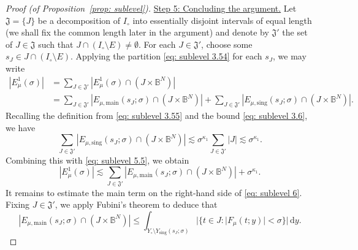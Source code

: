 \documentclass[reqno]{amsart}
\numberwithin{equation}{section}
\newcommand{\B}{\mathbb{B}}
\newcommand{\ud}{\mathrm{d}}
\newcommand{\fJ}{\mathfrak{J}}
\theoremstyle{plain}
\theoremstyle{definition}
\begin{document}
\begin{proof}[Proof (of Proposition~\ref{prop: sublevel})]



\noindent \underline{Step 5: Concluding the argument.} 
Let $\fJ = \{J\}$ be a decomposition of $I_{\circ}$ into essentially disjoint intervals of equal length (we shall fix the common length later in the argument) and denote by $\fJ'$
the set of $J\in \fJ$ such that $J \cap (I_{\circ}\setminus E) \neq \emptyset$. For each $J \in \fJ'$, choose some $s_J \in J \cap (I_{\circ} \setminus E)$. Applying the partition \eqref{eq: sublevel 3.54} for each $s_J$, we may write
\begin{align}
\nonumber
|E^1_{\mu}(\sigma)| &= \sum_{J \in \fJ'} |E^1_{\mu}(\sigma) \cap (J \times \B^N)| \\
\label{eq: sublevel 5.5}
&= \sum_{J \in \fJ'} |E_{\mu, \mathrm{main}}(s_J;\sigma) \cap (J \times \B^N)| +  \sum_{J \in \fJ'} |E_{\mu, \mathrm{sing}}(s_J;\sigma) \cap (J \times \B^N)|  .
\end{align}
Recalling the definition from \eqref{eq: sublevel 3.55} and the bound \eqref{eq: sublevel 3.6}, we have
\begin{equation*}
    \sum_{J \in \fJ'}|E_{\mu, \mathrm{sing}}(s_J; \sigma)\cap (J \times \B^N)| \lesssim \sigma^{\kappa_1} \sum_{J \in \fJ'} |J| \lesssim \sigma^{\kappa_1}.
\end{equation*}
Combining this with \eqref{eq: sublevel 5.5}, we obtain
\begin{equation}\label{eq: sublevel 6}
   |E^1_{\mu}(\sigma)| \lesssim \sum_{J \in \fJ'}|E_{\mu, \mathrm{main}}(s_J; \sigma)\cap (J \times \B^N)| + \sigma^{\kappa_1}.
\end{equation}
It remains to estimate the main term on the right-hand side of \eqref{eq: sublevel 6}. Fixing $J \in \fJ'$, we apply Fubini's theorem to deduce that 
\begin{equation}\label{eq: sublevel 7}
    |E_{\mu, \mathrm{main}}(s_J; \sigma)\cap (J \times \B^N)| \leq \int_{Y_{\circ} \setminus Y_{\mathrm{sing}}(s_J;\sigma)}  |\{t \in J : |F_{\mu}(t;y)| < \sigma \}| \,\ud y. 
\end{equation}


\end{proof}
\end{document}
